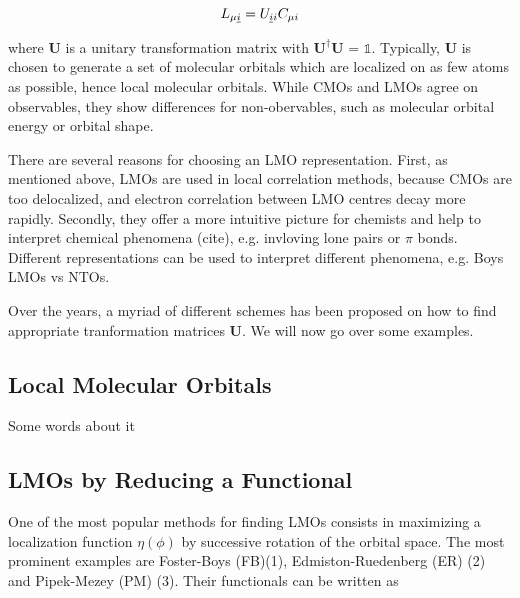 \begin{equation}
L_{\mu \underline{i}} = U_{\underline{i} i} C_{\mu i}
\end{equation}

\noindent where $\mathbf{U}$ is a unitary transformation matrix with $\mathbf{U}^{\dagger} \mathbf{U}$ = $\mathbb{1}$. Typically, $\mathbf{U}$ is chosen to generate a set of molecular orbitals which are localized on as few atoms as possible, hence local molecular orbitals. While CMOs and LMOs agree on observables, they show differences for non-obervables, such as molecular orbital energy or orbital shape.

There are several reasons for choosing an LMO representation. First, as mentioned above, LMOs are used in local correlation methods, because CMOs are too delocalized, and electron correlation between LMO centres decay more rapidly. Secondly, they offer a more intuitive picture for chemists and help to interpret chemical phenomena (cite), e.g. invloving lone pairs or $\pi$ bonds. Different representations can be used to interpret different phenomena, e.g. Boys LMOs vs NTOs.

Over the years, a myriad of different schemes has been proposed on how to find appropriate tranformation matrices $\mathbf{U}$. We will now go over some examples.

\subsection{Local Molecular Orbitals}

Some words about it

\subsection{LMOs by Reducing a Functional}

One of the most popular methods for finding LMOs consists in maximizing a localization function $\eta(\phi)$ by successive rotation of the orbital space. The most prominent examples are Foster-Boys (FB)(1), Edmiston-Ruedenberg (ER) (2) and Pipek-Mezey (PM) (3). Their functionals can be written as


